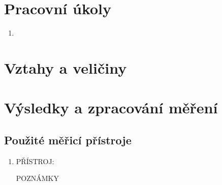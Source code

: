 \documentclass{../concepts/titul_zprava_p/prepareprotokolZprava} %
\begin{document}
\renewcommand{\figurename}{Graf}
\renewcommand{\refname}{Literatura}
\renewcommand{\today}{\number\day.\,\number\month.\,\number\year}

\graphicspath{{../concepts/titul_protokol_p/}}
\maketitle

\section{Pracovní úkoly}
\begin{enumerate}
    \item
\end{enumerate}

\section{Vztahy a veličiny}







\section{Výsledky a zpracování měření}


\subsection{Použité měřicí přístroje}
\begin{enumerate}
    \item PŘÍSTROJ:
    
    POZNÁMKY

\end{enumerate}
\end{document}
